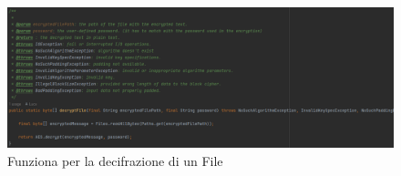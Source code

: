 \textsf{\small } %

\begin{figure}[H]
	\centering
	\includegraphics[width=1\textwidth, height=1\textheight, keepaspectratio]{./images/code/java/decryptFile.PNG}
	\caption{Funziona per la decifrazione di un File}
	\label{fig:decryptFile}
\end{figure}

\textsf{\small } %

